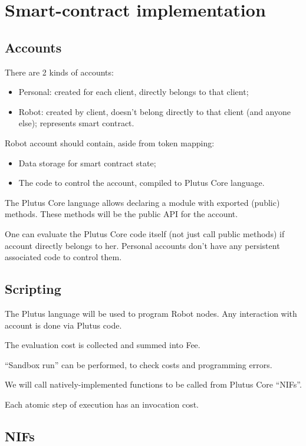 \appendix

\section{Smart-contract implementation}

\subsection{Accounts}

There are 2 kinds of accounts:
\begin{itemize}
  \item Personal: created for each client, directly belongs to that client;
  \item Robot: created by client, doesn't belong directly to that client (and anyone else); represents smart contract.
\end{itemize}

Robot account should contain, aside from token mapping:
\begin{itemize}
  \item Data storage for smart contract state;
  \item The code to control the account, compiled to Plutus Core language.
\end{itemize}

The Plutus Core language allows declaring a module with exported (public) methods.
These methods will be the public API for the account.

One can evaluate the Plutus Core code itself (not just call public methods) if account directly belongs to her.
Personal accounts don't have any persistent associated code to control them.

\subsection{Scripting}

The Plutus language will be used to program Robot nodes.
Any interaction with account is done via Plutus code.

The evaluation cost is collected and summed into Fee.

``Sandbox run'' can be performed, to check costs and programming errors.

We will call natively-implemented functions to be called from Plutus Core ``NIFs''.

Each atomic step of execution has an invocation cost.

\subsection{NIFs}


